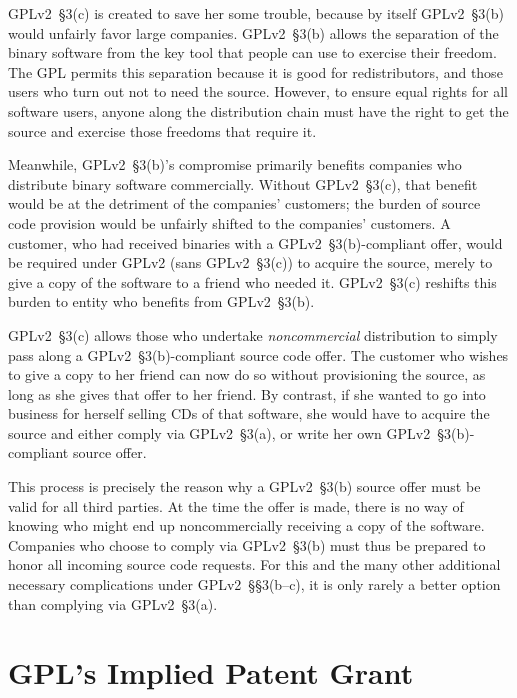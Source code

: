 GPLv2~\S3(c) is created to save her some trouble, because by itself GPLv2~\S3(b)
would unfairly favor large companies.  GPLv2~\S3(b) allows the
separation of the binary software from the key tool that people can use
to exercise their freedom. The GPL permits this separation because it is
good for redistributors, and those users who turn out not to need the
source.  However, to ensure equal rights for all software users, anyone
along the distribution chain must have the right to get the source and
exercise those freedoms that require it.

Meanwhile, GPLv2~\S3(b)'s compromise primarily benefits companies who
distribute binary software commercially.  Without GPLv2~\S3(c), that benefit
would be at the detriment of the companies' customers; the burden of
source code provision would be unfairly shifted to the companies'
customers.  A customer, who had received binaries with a GPLv2~\S3(b)-compliant
offer, would be required under GPLv2 (sans GPLv2~\S3(c)) to acquire the source,
merely to give a copy of the software to a friend who needed it.  GPLv2~\S3(c)
reshifts this burden to entity who benefits from GPLv2~\S3(b).

GPLv2~\S3(c) allows those who undertake \emph{noncommercial} distribution to
simply pass along a GPLv2~\S3(b)-compliant source code offer.  The customer who
wishes to give a copy to her friend can now do so without provisioning the
source, as long as she gives that offer to her friend.  By contrast, if
she wanted to go into business for herself selling CDs of that software,
she would have to acquire the source and either comply via GPLv2~\S3(a), or
write her own GPLv2~\S3(b)-compliant source offer.

This process is precisely the reason why a GPLv2~\S3(b) source offer must be
valid for all third parties.  At the time the offer is made, there is no
way of knowing who might end up noncommercially receiving a copy of the
software.  Companies who choose to comply via GPLv2~\S3(b) must thus be
prepared to honor all incoming source code requests.  For this and the
many other additional necessary complications under GPLv2~\S\S3(b--c), it is
only rarely a better option than complying via GPLv2~\S3(a).

\chapter{GPL's Implied Patent Grant}
\label{gpl-implied-patent-grant}

